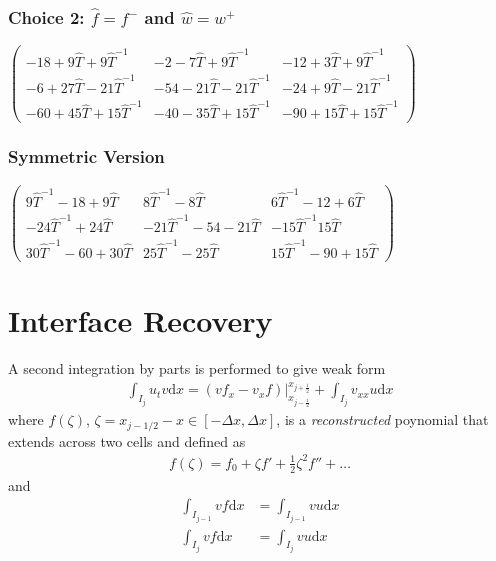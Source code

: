 \documentclass[10pt,letterpaper]{article}
\begin{document}
\subsubsection{Choice 2: $\hat{f} = f^-$ and $\hat{w} = w^+$}
$\left(
\begin{array}{ccc}
 -18+9 \hat{T}+9 \hat{T}^{-1}& -2-7 \hat{T}+9 \hat{T}^{-1}& -12+3 \hat{T}+9 \hat{T}^{-1}\\
 -6+27 \hat{T}-21 \hat{T}^{-1}& -54-21 \hat{T}-21 \hat{T}^{-1}& -24+9 \hat{T}-21 \hat{T}^{-1}\\
 -60+45 \hat{T}+15 \hat{T}^{-1}& -40-35 \hat{T}+15 \hat{T}^{-1}& -90+15 \hat{T}+15 \hat{T}^{-1}
\end{array}
\right)$

\subsubsection{Symmetric Version}
$\left(
\begin{array}{ccc}
 9 \hat{T}^{-1}-18+9 \hat{T} & 8 \hat{T}^{-1} -8 \hat{T}& 6 \hat{T}^{-1}-12+6 \hat{T} \\
 -24 \hat{T}^{-1}+24 \hat{T} & -21 \hat{T}^{-1}-54-21 \hat{T} & -15 \hat{T}^{-1}15 \hat{T} \\
 30 \hat{T}^{-1}-60+30 \hat{T} & 25 \hat{T}^{-1}-25 \hat{T} & 15 \hat{T}^{-1}-90+15 \hat{T}
\end{array}
\right)$

\section{Interface Recovery}
  A second integration by parts is performed to give weak form
  \begin{align*}
    \int_{I_j} u_t v \mathrm{d}x 
    =
    \left(vf_x - v_xf\right) \bigr|_{x_{j-\frac{1}{2}}}^{x_{j+\frac{1}{2}}}
    +
    \int_{I_j}v_{xx}u\mathrm{d}x
  \end{align*}
  where $f(\zeta)$, $\zeta=x_{j-1/2}-x \in [-\Delta x,\Delta x]$, is a
  \emph{reconstructed} poynomial that extends across two cells
  and defined as
  \begin{align*}
    f(\zeta) = f_0 + \zeta f' + \frac{1}{2}\zeta^2 f'' + \ldots
  \end{align*}
  and
  \begin{align*}
    \int_{I_{j-1}} v f \mathrm{d}x &= \int_{I_{j-1}} v u \mathrm{d}x \\
    \int_{I_{j}} v f \mathrm{d}x &= \int_{I_{j}} v u \mathrm{d}x
  \end{align*}
  
\end{document}
